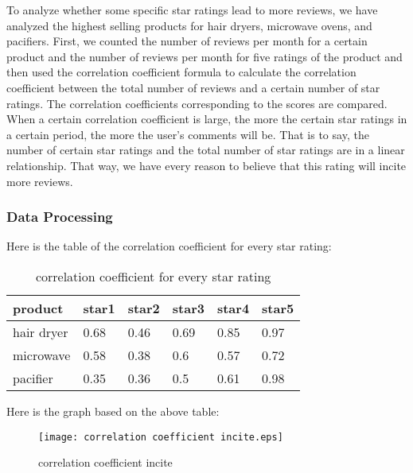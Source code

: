\documentclass{mcmthesis}
\begin{document}
	To analyze whether some specific star ratings lead to more reviews, we have analyzed the highest selling products for hair dryers, microwave ovens, and pacifiers. First, we counted the number of reviews per month for a certain product and the number of reviews per month for five ratings of the product and then used the correlation coefficient formula to calculate the correlation coefficient between the total number of reviews and a certain number of star ratings. The correlation coefficients corresponding to the scores are compared. When a certain correlation coefficient is large, the more the certain star ratings in a certain period, the more the user's comments will be. That is to say, the number of certain star ratings and the total number of star ratings are in a linear relationship. That way, we have every reason to believe that this rating will incite more reviews.
	
	\subsubsection{Data Processing}
	
	Here is the table of the correlation coefficient for every star rating:
	
	\begin{table}[H]
		\centering
		\caption{correlation coefficient for every star rating}
		\resizebox{\textwidth}{!}
		{%
			\begin{tabular}{|l|l|l|l|l|l|}
				\hline
				product    & star1 & star2 & star3 & star4 & star5 \\ \hline
				hair dryer & 0.68  & 0.46  & 0.69  & 0.85  & 0.97  \\ \hline
				microwave  & 0.58  & 0.38  & 0.6   & 0.57  & 0.72  \\ \hline
				pacifier   & 0.35  & 0.36  & 0.5   & 0.61  & 0.98  \\ \hline
			\end{tabular}%
		}
	\end{table}
	
	Here is the graph based on the above table:
	
	\begin{figure}[H]
		\small
		\centering
		\texttt{[image: correlation coefficient incite.eps]}
		\caption{correlation coefficient incite} \label{fig:correlation coefficient incite}
	\end{figure}
	
\end{document}
